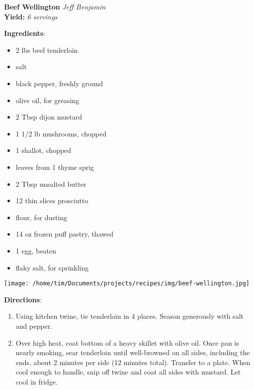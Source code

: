 \documentclass[11pt, twoside, openany]{book}
\begin{document}
\noindent\begin{minipage}[t]{\linewidth}%
{\Large\textbf{Beef Wellington}} \label{beef-wellington}\hfill\textit{Jeff Benjamin}\\
\textbf{Yield:} \textit{6 servings}\\
\noindent\begin{minipage}[t]{0.78\linewidth}%
\textbf{Ingredients}:\vspace{-3mm}
\begin{multicols}{2}
\begin{itemize}\setlength\itemsep{-1mm}
\item 2 lbs beef tenderloin
\item salt
\item black pepper, freshly ground
\item olive oil, for greasing
\item 2 Tbsp dijon mustard
\item 1 1/2 lb mushrooms, chopped
\item 1 shallot, chopped
\item leaves from 1 thyme sprig
\item 2 Tbsp unsalted butter
\item 12 thin slices prosciutto
\item flour, for dusting
\item 14 oz frozen puff pastry, thawed
\item 1 egg, beaten
\item flaky salt, for sprinkling
\end{itemize}
\end{multicols}
\end{minipage}
\noindent\begin{minipage}[t]{0.18\linewidth}
\centering \strut\vspace*{-\baselineskip}\newline
\texttt{[image: /home/tim/Documents/projects/recipes/img/beef-wellington.jpg]}\\
\end{minipage}\vspace{3mm}
\textbf{Directions}:
\vspace{-3mm}\begin{enumerate}\setlength\itemsep{-1mm}
\item Using kitchen twine, tie tenderloin in 4 places. Season generously with salt and pepper.
\item Over high heat, coat bottom of a heavy skillet with olive oil. Once pan is nearly smoking, sear tenderloin until well-browned on all sides, including the ends, about 2 minutes per side (12 minutes total). Transfer to a plate. When cool enough to handle, snip off twine and coat all sides with mustard. Let cool in fridge.

\end{enumerate}
\end{minipage}
\end{document}
